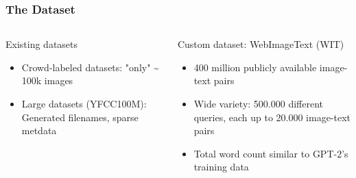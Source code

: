 \begin{frame}
    \frametitle{The Dataset}

    \begin{columns}[t]
        \begin{column}{0.5\textwidth}
            Existing datasets
            \begin{itemize}
                \item Crowd-labeled datasets: "only" \~{} 100k images
                \item Large datasets (YFCC100M): Generated filenames, sparse metdata
            \end{itemize}
        \end{column}
        \pause
        \begin{column}{0.5\textwidth}
            Custom dataset: WebImageText (WIT)
            \begin{itemize}
                \item 400 million publicly available image-text pairs
                \item Wide variety: 500.000 different queries, each up to 20.000 image-text pairs
                \item Total word count similar to GPT-2's training data
            \end{itemize}
        \end{column}
    \end{columns}
\end{frame}
